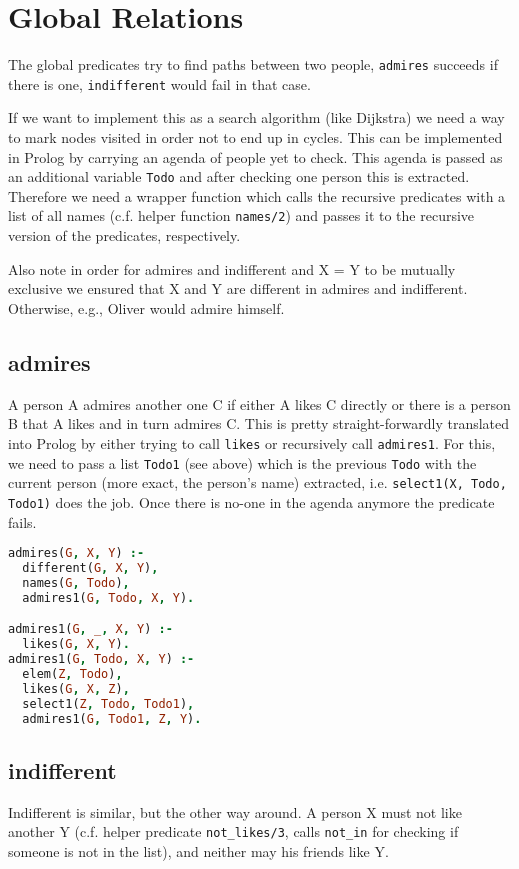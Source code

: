 \documentclass{article}
\begin{document}
\section{Global Relations}

The global predicates try to find paths between two people, \texttt{admires} succeeds if there is one, \texttt{indifferent} would fail in that case.

If we want to implement this as a search algorithm (like Dijkstra) we need a way to mark nodes visited in order not to end up in cycles.
This can be implemented in Prolog by carrying an agenda of people yet to check.
This agenda is passed as an additional variable \texttt{Todo} and after checking one person this is extracted. Therefore we need a wrapper function which calls the recursive predicates with a list of all names (c.f. helper function \texttt{names/2}) and passes it to the recursive version of the predicates, respectively.

Also note in order for admires and indifferent and X = Y to be mutually exclusive we ensured that X and Y are different in admires and indifferent.
Otherwise, e.g., Oliver would admire himself.

\subsection{admires}
A person A admires another one C if either A likes C directly or there is a person B that A likes and in turn admires C. This is pretty straight-forwardly translated into Prolog by either trying to call \texttt{likes} or recursively call \texttt{admires1}.
For this, we need to pass a list \texttt{Todo1} (see above) which is the previous \texttt{Todo} with the current person (more exact, the person's name) extracted, i.e. \texttt{select1(X, Todo, Todo1)} does the job. Once there is no-one in the agenda anymore the predicate fails.

\begin{lstlisting}[language=Prolog]
admires(G, X, Y) :-
  different(G, X, Y),
  names(G, Todo),
  admires1(G, Todo, X, Y).

admires1(G, _, X, Y) :-
  likes(G, X, Y).
admires1(G, Todo, X, Y) :-
  elem(Z, Todo),
  likes(G, X, Z),
  select1(Z, Todo, Todo1),
  admires1(G, Todo1, Z, Y).
\end{lstlisting}

\subsection{indifferent}
Indifferent is similar, but the other way around. A person X must not like another Y (c.f. helper predicate \texttt{not\_likes/3}, calls \texttt{not\_in}
for checking if someone is not in the list), and neither may his friends like Y.
\end{document}
